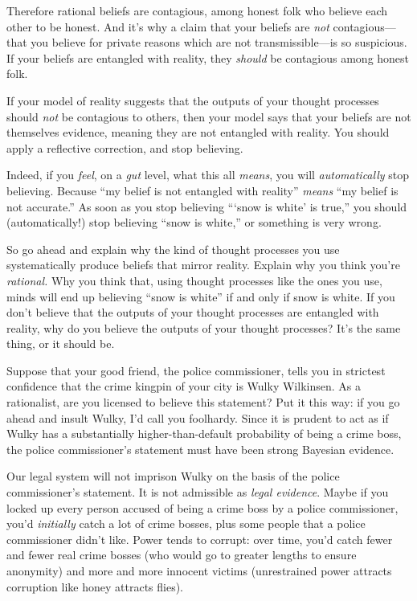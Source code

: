{
 Therefore rational beliefs are contagious, among honest folk who
believe each other to be honest. And it's why a claim
that your beliefs are \textit{not} contagious---that you believe for
private reasons which are not transmissible---is so suspicious. If your
beliefs are entangled with reality, they \textit{should} be contagious
among honest folk.}

{
 If your model of reality suggests that the outputs of your thought
processes should \textit{not} be contagious to others, then your model
says that your beliefs are not themselves evidence, meaning they are
not entangled with reality. You should apply a reflective correction,
and stop believing.}

{
 Indeed, if you \textit{feel}, on a \textit{gut} level, what this
all \textit{means}, you will \textit{automatically} stop believing.
Because ``my belief is not entangled with
reality'' \textit{means} ``my belief
is not accurate.'' As soon as you stop believing
```snow is white' is
true,'' you should (automatically!) stop believing
``snow is white,'' or something is
very wrong.}

{
 So go ahead and explain why the kind of thought processes you use
systematically produce beliefs that mirror reality. Explain why you
think you're \textit{rational.} Why you think that,
using thought processes like the ones you use, minds will end up
believing ``snow is white'' if and
only if snow is white. If you don't believe that the
outputs of your thought processes are entangled with reality, why do
you believe the outputs of your thought processes? It's
the same thing, or it should be.}

\myendsectiontext


{
 Suppose that your good friend, the police commissioner, tells you
in strictest confidence that the crime kingpin of your city is Wulky
Wilkinsen. As a rationalist, are you licensed to believe this
statement? Put it this way: if you go ahead and insult Wulky,
I'd call you foolhardy. Since it is prudent to act as
if Wulky has a substantially higher-than-default probability of being a
crime boss, the police commissioner's statement must
have been strong Bayesian evidence. }

{
 Our legal system will not imprison Wulky on the basis of the
police commissioner's statement. It is not admissible
as \textit{legal evidence}. Maybe if you locked up every person accused
of being a crime boss by a police commissioner, you'd
\textit{initially} catch a lot of crime bosses, plus some people that a
police commissioner didn't like. Power tends to
corrupt: over time, you'd catch fewer and fewer real
crime bosses (who would go to greater lengths to ensure anonymity) and
more and more innocent victims (unrestrained power attracts corruption
like honey attracts flies).}

